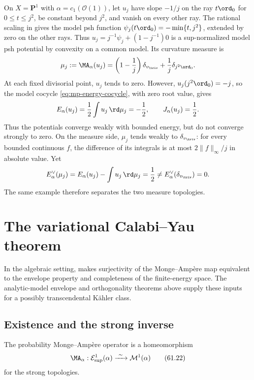 \begin{example}\label{ex:mpwn-weak-bounded-not-strong}
On $X=\mathbf P^1$ with $\alpha=c_1(\mathcal O(1))$, let $u_j$
have slope $-1/j$ on the ray $t\ord_0$ for $0\leq t\leq j^2$,
be constant beyond $j^2$, and vanish on every other ray.
The rational scaling in  gives the
model psh function $\psi_j(t\ord_0)=-\min\{t,j^2\}$, extended by
zero on the other rays. Thus
$u_j=j^{-1}\psi_j+(1-j^{-1})0$ is a sup-normalized model psh
potential by convexity on a common model. Its curvature measure is
\[
 \mu_j:=\MA_\alpha(u_j)
      =\left(1-\frac1j\right)\delta_{v_{\triv}}
                         +\frac1j\delta_{j^2\ord_0}.
\]
At each fixed divisorial point, $u_j$ tends to zero.  However,
$u_j(j^2\ord_0)=-j$, so the model cocycle
\eqref{eq:mp-energy-cocycle}, with zero root value, gives
\[
 E_\alpha(u_j)=\frac12\int u_j\,\rd\mu_j=-\frac12,
 \qquad J_\alpha(u_j)=\frac12.
\]
Thus the potentials converge weakly with bounded energy, but
do not converge strongly to zero.  On the measure side,
$\mu_j$ tends weakly to $\delta_{v_{\triv}}$: for every bounded
continuous $f$, the difference of its integrals is at most
$2\|f\|_\infty/j$ in absolute value.  Yet
\[
 E_\alpha^\vee(\mu_j)
      =E_\alpha(u_j)-\int u_j\,\rd\mu_j
      =\frac12
      \ne E_\alpha^\vee(\delta_{v_{\triv}})=0.
\]
The same example therefore separates the two measure topologies.
\end{example}


\section{The variational Calabi--Yau theorem}
\label{sec:mpwn-calabi-yau}

In the algebraic setting, \cite[Theorem~12.8]{BJ22} makes surjectivity of the
Monge--Amp\`ere map equivalent to the envelope property and completeness of
the finite-energy space.  The analytic-model envelope and orthogonality
theorems above supply these inputs for a possibly transcendental
K\"ahler class.

\subsection{Existence and the strong inverse}
\label{subsec:mpwn-variational-existence}

\begin{theorem}\label{thm:mpwn-cy}
The probability Monge--Amp\`ere operator is a homeomorphism
\[
 \MA_\alpha:
 \mathcal E^1_{\sup}(\alpha)
       \xrightarrow{\ \sim\ }\mathcal M^1(\alpha)
\tag{61.22}\label{eq:mpwn-cy-homeomorphism}
\]
for the strong topologies.
\end{theorem}

